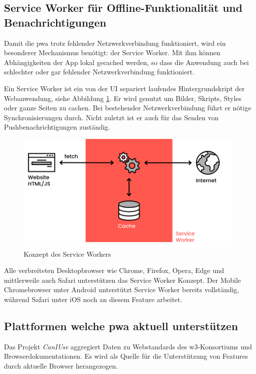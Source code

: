\subsection{Service Worker für Offline-Funktionalität und Benachrichtigungen}
\label{chap:service_worker}

Damit die \ac{pwa} trotz fehlender Netzwerkverbindung funktioniert, wird ein besonderer Mechanismus benötigt: der Service Worker. Mit ihm können Abhängigkeiten der App lokal gecached werden, so dass die Anwendung auch bei schlechter oder gar fehlender Netzwerkverbindung funktioniert. \cite[S. 7]{BeginningPWA}

Ein Service Worker ist ein von der UI separiert laufendes Hintergrundskript der Webanwendung, siehe Abbildung \ref{fig:serviceWorker}. Er wird genutzt um Bilder, Skripts, Styles oder ganze Seiten zu cachen. Bei bestehender Netzwerkverbindung führt er nötige Synchronisierungen durch. Nicht zuletzt ist er auch für das Senden von Pushbenachrichtigungen zuständig. \cite[S. 24]{BeginningPWA}

\begin{figure}[h!]
        \includegraphics[width=\linewidth]{img/ServiceWorker-8a0968f1b295f1ff.png}
        \centering
        \caption{Konzept des Service Workers \cite{ServiceWorkerDiagramm}}
        \label{fig:serviceWorker}
\end{figure}


Alle verbreiteten Desktopbrowser wie Chrome, Firefox, Opera, Edge und mittlerweile auch Safari unterstützen das Service Worker Konzept. Der Mobile Chromebrowser unter Android unterstützt Service Worker bereits vollständig, während Safari unter iOS noch an diesem Feature arbeitet. \cite[S. 9]{BeginningPWA}


\subsection{Plattformen welche \ac{pwa} aktuell unterstützen}
Das Projekt \textit{CanIUse} aggregiert Daten zu Webstandards des w3-Konsortiums und Browserdokumentationen. Es wird als Quelle für die Unterstützung von Features durch aktuelle Browser herangezogen.

